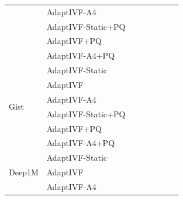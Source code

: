 \begin{table}[t]
\begin{tabular}{llrrrrrr}
 & AdaptIVF-A4        & \placeholder{\_\_\_} & \placeholder{\_\_\_} & \placeholder{\_\_\_} & \placeholder{\_\_\_} & \placeholder{\_\_\_} & \placeholder{\_\_\_} \\
 & AdaptIVF-Static+PQ & \placeholder{\_\_\_} & \placeholder{\_\_\_} & \placeholder{\_\_\_} & \placeholder{\_\_\_} & \placeholder{\_\_\_} & \placeholder{\_\_\_} \\
 & AdaptIVF+PQ        & \placeholder{\_\_\_} & \placeholder{\_\_\_} & \placeholder{\_\_\_} & \placeholder{\_\_\_} & \placeholder{\_\_\_} & \placeholder{\_\_\_} \\
 & AdaptIVF-A4+PQ     & \placeholder{\_\_\_} & \placeholder{\_\_\_} & \placeholder{\_\_\_} & \placeholder{\_\_\_} & \placeholder{\_\_\_} & \placeholder{\_\_\_} \\
\midrule
\multirow{6}{*}{Gist}
 & AdaptIVF-Static    & \placeholder{\_\_\_} & \placeholder{\_\_\_} & \placeholder{\_\_\_} & \placeholder{\_\_\_} & \placeholder{\_\_\_} & \placeholder{\_\_\_} \\
 & AdaptIVF           & \placeholder{\_\_\_} & \placeholder{\_\_\_} & \placeholder{\_\_\_} & \placeholder{\_\_\_} & \placeholder{\_\_\_} & \placeholder{\_\_\_} \\
 & AdaptIVF-A4        & \placeholder{\_\_\_} & \placeholder{\_\_\_} & \placeholder{\_\_\_} & \placeholder{\_\_\_} & \placeholder{\_\_\_} & \placeholder{\_\_\_} \\
 & AdaptIVF-Static+PQ & \placeholder{\_\_\_} & \placeholder{\_\_\_} & \placeholder{\_\_\_} & \placeholder{\_\_\_} & \placeholder{\_\_\_} & \placeholder{\_\_\_} \\
 & AdaptIVF+PQ        & \placeholder{\_\_\_} & \placeholder{\_\_\_} & \placeholder{\_\_\_} & \placeholder{\_\_\_} & \placeholder{\_\_\_} & \placeholder{\_\_\_} \\
 & AdaptIVF-A4+PQ     & \placeholder{\_\_\_} & \placeholder{\_\_\_} & \placeholder{\_\_\_} & \placeholder{\_\_\_} & \placeholder{\_\_\_} & \placeholder{\_\_\_} \\
\midrule
\multirow{6}{*}{Deep1M}
 & AdaptIVF-Static    & \placeholder{\_\_\_} & \placeholder{\_\_\_} & \placeholder{\_\_\_} & \placeholder{\_\_\_} & \placeholder{\_\_\_} & \placeholder{\_\_\_} \\
 & AdaptIVF           & \placeholder{\_\_\_} & \placeholder{\_\_\_} & \placeholder{\_\_\_} & \placeholder{\_\_\_} & \placeholder{\_\_\_} & \placeholder{\_\_\_} \\
 & AdaptIVF-A4        & \placeholder{\_\_\_} & \placeholder{\_\_\_} & \placeholder{\_\_\_} & \placeholder{\_\_\_} & \placeholder{\_\_\_} & \placeholder{\_\_\_} \\

\end{tabular}
\end{table}
